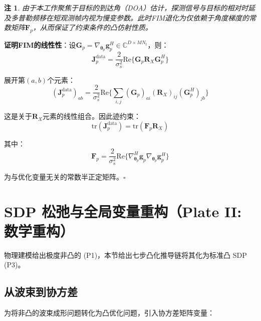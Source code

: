 \documentclass[12pt,a4paper]{article}
\newtheorem{remark}{注}
\newcommand{\vect}[1]{\mathbf{#1}}
\newcommand{\mat}[1]{\mathbf{#1}}
\newcommand{\tr}{\text{tr}}
\newcommand{\Real}{\text{Re}}
\begin{document}
\begin{remark}
由于本工作聚焦于目标的到达角（DOA）估计，探测信号与目标的相对时延及多普勒频移在短观测帧内视为慢变参数。此时FIM退化为仅依赖于角度梯度的常数矩阵$\mat{F}_p$，从而保证了约束条件的凸仿射性质。
\end{remark}

\textbf{证明FIM的线性性}：设$\mat{G}_p = \nabla_{\boldsymbol{\theta}_p} \vect{g}_p^H \in \mathbb{C}^{D \times MN_t}$，则：
\begin{equation}
\mat{J}_p^{\text{data}} = \frac{2}{\sigma_s^2} \Real\{ \mat{G}_p \mat{R}_X \mat{G}_p^H \}
\end{equation}

展开第$(a,b)$个元素：
\begin{equation}
(\mat{J}_p^{\text{data}})_{ab} = \frac{2}{\sigma_s^2} \Real\Big\{ \sum_{i,j} (\mat{G}_p)_{ai} (\mat{R}_X)_{ij} (\mat{G}_p^H)_{jb} \Big\}
\end{equation}

这是关于$\mat{R}_X$元素的线性组合。因此迹约束：
\begin{equation}
\tr(\mat{J}_p^{\text{data}}) = \tr(\mat{F}_p \mat{R}_X) \tag{12}
\end{equation}

其中：
\begin{equation}
\mat{F}_p = \frac{2}{\sigma_s^2} \Real\Big\{ \nabla_{\boldsymbol{\theta}_p}^H \vect{g}_p \nabla_{\boldsymbol{\theta}_p} \vect{g}_p^H \Big\} \tag{13}
\end{equation}

为与优化变量无关的常数半正定矩阵。\hfill$\square$

\section{SDP 松弛与全局变量重构（Plate II: 数学重构）}

物理建模给出极度非凸的 (P1)，本节给出七步凸化推导链将其化为标准凸 SDP (P3)。



\subsection{从波束到协方差}

为将非凸的波束成形问题转化为凸优化问题，引入协方差矩阵变量：
\end{document}
